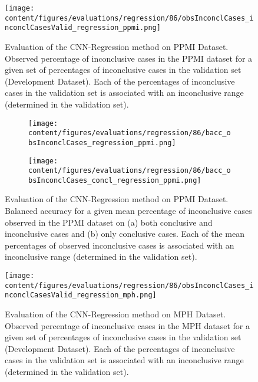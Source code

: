 


\begin{figure}[h]
\centering
\texttt{[image: content/figures/evaluations/regression/86/obsInconclCases\_inconclCasesValid\_regression\_ppmi.png]}
\caption{Evaluation of the CNN-Regression method on PPMI Dataset.
Observed percentage of inconclusive cases in the PPMI dataset 
for a given set of percentages of inconclusive cases in the validation set (Development Dataset).
Each of the percentages of inconclusive cases in the validation set is associated 
with an inconclusive range (determined in the validation set).} 
\label{fig:obsInconclCases_inconclCasesValid_regression_ppmi}
\end{figure} 


\begin{figure}[t]
\begin{subfigure}{0.9\textwidth}
  \centering
  \texttt{[image: content/figures/evaluations/regression/86/bacc\_obsInconclCases\_regression\_ppmi.png]}
  \subcaption{}
  \label{fig:bacc_obsInconclCases_regression_ppmi}
\end{subfigure}
\hfill
\begin{subfigure}{0.9\textwidth}
  \centering
  \texttt{[image: content/figures/evaluations/regression/86/bacc\_obsInconclCases\_concl\_regression\_ppmi.png]}
  \subcaption{}
  \label{fig:bacc_obsInconclCases_concl_regression_ppmi}
\end{subfigure}

\caption{Evaluation of the CNN-Regression method on PPMI Dataset.
Balanced accuracy for a given mean percentage of inconclusive cases observed in the PPMI dataset on 
(a) both conclusive and inconclusive cases and (b) only conclusive cases. 
Each of the mean percentages of observed inconclusive cases is associated 
with an inconclusive range (determined in the validation set). }
\label{fig:bacc_obsInconclCases_regression_ppmi_full}
\end{figure}





\begin{figure}[h]
\centering
\texttt{[image: content/figures/evaluations/regression/86/obsInconclCases\_inconclCasesValid\_regression\_mph.png]}
\caption{Evaluation of the CNN-Regression method on MPH Dataset.
Observed percentage of inconclusive cases in the MPH dataset 
for a given set of percentages of inconclusive cases in the validation set (Development Dataset).
Each of the percentages of inconclusive cases in the validation set is associated 
with an inconclusive range (determined in the validation set).} 
\label{fig:obsInconclCases_inconclCasesValid_regression_mph}
\end{figure} 


